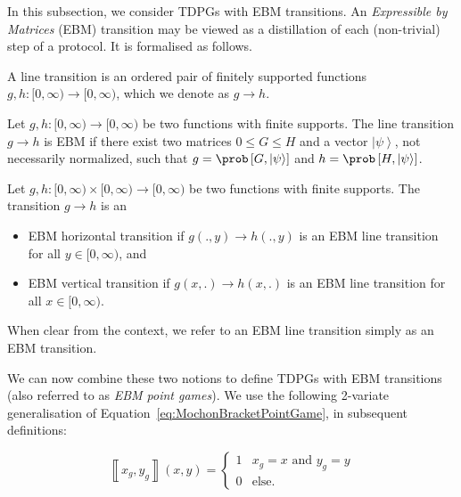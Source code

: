 \documentclass{article}
\begin{document}
In this subsection, we consider TDPGs with EBM transitions. An \emph{Expressible by Matrices} (EBM) transition may be viewed as a distillation of each (non-trivial) step of a protocol. It is formalised as follows.
%

%

\begin{definition}
  A line transition is an ordered pair of finitely supported functions $g,h:[0,\infty)\to[0,\infty)$, which
  we denote as $g\to h$.\label{def:transition}
\end{definition}

\begin{definition}
  Let $g,h:[0,\infty)\to[0,\infty)$ be two functions with finite
  supports. The line transition $g\to h$ is EBM if there exist two matrices $0\le G\le H$ and a vector $\left|\psi\right\rangle $, not necessarily
  normalized, such that $g=\prob\left[G,\left|\psi\right\rangle \right]$
  and $h=\prob\left[H,\left|\psi\right\rangle \right]$.\label{def:EBMlineTransition}
\end{definition}

\begin{definition}
  Let $g,h:[0,\infty)\times[0,\infty)\to[0,\infty)$ be two functions
  with finite supports. The transition $g\to h$ is an
  \begin{itemize}
    \item EBM horizontal transition if $g(.,y)\to h(.,y)$
          is an EBM line transition for all $y\in[0,\infty)$, and
    \item EBM vertical transition if $g(x,.)\to h(x,.)$
          is an EBM line transition for all $x\in[0,\infty)$.
  \end{itemize}
\end{definition}

\begin{remark}
  When clear from the context, we refer to an EBM line transition simply
  as an EBM transition.
\end{remark}
%
We can now combine these two notions to define TDPGs with EBM transitions (also referred to as \emph{EBM point games}). We use the following 2-variate generalisation of Equation~\eqref{eq:MochonBracketPointGame}, in subsequent definitions: %
%
%

%
%
%
%
%
%

\begin{displaymath}
  \left\llbracket x_{g},y_{g}\right\rrbracket (x,y)=\begin{cases}
    1 & x_{g}=x\text{ and }y_{g}=y \\
    0 & \text{else.}
  \end{cases}
\end{displaymath}
\end{document}
